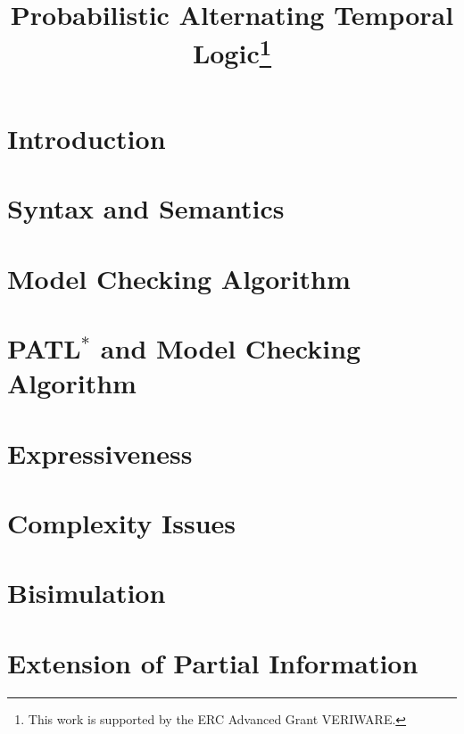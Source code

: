 \documentclass{llncs}
\begin{document}
 
\title{Probabilistic Alternating Temporal Logic\thanks{This work is supported by
the ERC Advanced Grant VERIWARE.}}
 
\author{}
\email{}

\maketitle
 
\begin{abstract}
 
\end{abstract}
 
\section{Introduction}
 
\section{Syntax and Semantics}

\section{Model Checking Algorithm}

\section{PATL$^*$ and Model Checking Algorithm}

\section{Expressiveness}

\section{Complexity Issues}

\section{Bisimulation}

\section{Extension of Partial Information}
\end{document}
